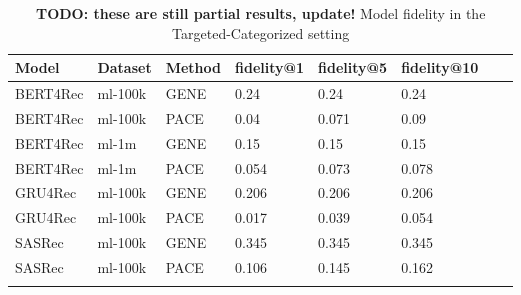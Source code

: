 \begingroup
    \setlength{\tabcolsep}{6pt} %
    \renewcommand{\arraystretch}{1.2} %
    \small %
    \begin{longtable}{|l|l|l|l|l|l|l|l|}
    \hline
\textbf{Model} & \textbf{Dataset} & \textbf{Method} & \textbf{fidelity@1} & \textbf{fidelity@5} & \textbf{fidelity@10} \\ \hline
\endhead
BERT4Rec & ml-100k & GENE & 0.24 & 0.24 & 0.24 \\
BERT4Rec & ml-100k & PACE & 0.04 & 0.071 & 0.09 \\\hline
BERT4Rec & ml-1m & GENE & 0.15 & 0.15 & 0.15 \\
BERT4Rec & ml-1m & PACE & 0.054 & 0.073 & 0.078 \\\hline
GRU4Rec & ml-100k & GENE & 0.206 & 0.206 & 0.206 \\
GRU4Rec & ml-100k & PACE & 0.017 & 0.039 & 0.054 \\\hline
SASRec & ml-100k & GENE & 0.345 & 0.345 & 0.345 \\
SASRec & ml-100k & PACE & 0.106 & 0.145 & 0.162 \\\hline
\caption{\textbf{TODO: these are still partial results, update!} Model fidelity in the Targeted-Categorized setting}
    \label{tab:eval_targ_cat}
    \end{longtable}
    \endgroup